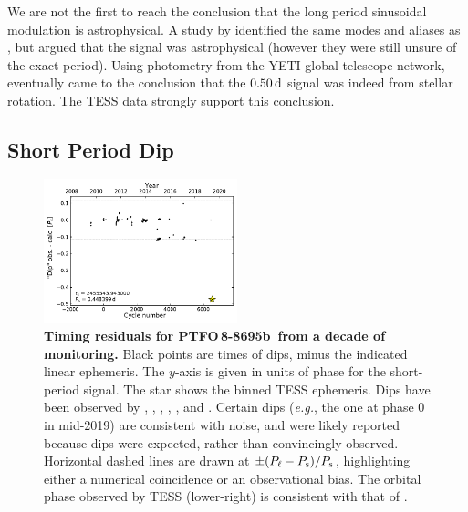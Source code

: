 \documentclass[12pt,twocolumn,tighten]{aastex62}
\newcommand{\ptfob}{PTFO$\,$8-8695b}
\begin{document}
We are not the first to reach the conclusion that the long period
sinusoidal modulation is astrophysical.  A study by
\citet{koen_multicolour_2015} identified the same modes and aliases as
\citet{van_eyken_ptf_2012}, but argued that the signal was
astrophysical (however they were still unsure of the exact period).
Using photometry from the YETI global telescope network,
\citet{raetz_yeti_2016} eventually came to the conclusion that the
$0.50\,{\rm d}$ signal was indeed from stellar rotation.  The TESS
data strongly support this conclusion.



\subsection{Short Period Dip}

\begin{figure}[t]
	\begin{center}
		\leavevmode
		\includegraphics[width=0.5\textwidth]{f6.pdf}
	\end{center}
	\vspace{-0.7cm}
	\caption{
		{\bf Timing residuals for \ptfob\ from a decade of monitoring.}
		Black points are times of dips, minus the indicated linear
		ephemeris.  The $y$-axis is given in units of phase for the
		short-period signal.  The star shows the binned TESS ephemeris.
		Dips have been observed by \citet{van_eyken_ptf_2012},
		\citet{ciardi_followup_2015}, \citet{yu_tests_2015},
		\citet{raetz_yeti_2016}, \citet{onitsuka_multicolor_2017}, and
		\citet{tanimoto_evidence_2020}.  Certain dips ({\it e.g.}, the one
		at phase 0 in mid-2019) are consistent with noise, and were likely
		reported because dips were expected, rather than
		convincingly observed.  Horizontal dashed lines are drawn at
		$\pm (P_{\rm \ell} - P_{\rm s})/P_{\rm s}$, highlighting either a
		numerical coincidence or an observational bias.  The orbital phase
		observed by TESS (lower-right) is consistent with that of
		\citet{tanimoto_evidence_2020}.
		\label{fig:o_minus_c}
	}
\end{figure}
\end{document}
